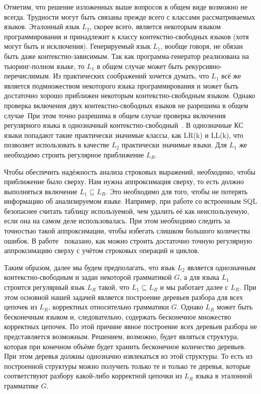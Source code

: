 Отметим, что решение изложенных выше вопросов в общем виде возможно не всегда. Трудности могут быть связаны прежде всего с классами рассматриваемых языков. Эталонный язык $L_2$, скорее всего, является некоторым языком программирования и принадлежит к классу контекстно-свободных языков (хотя могут быть и исключения). Генерируемый язык $L_1$, вообще говоря, не обязан быть даже контекстно-зависимым. Так как программа-генератор реализована на тьюринг-полном языке, то $L_1$ в общем случае может быть рекурсивно-перечислимым. Из практических соображений хочется думать, что $L_1$ всё же является подмножеством некоторого языка программирования и может быть достаточно хорошо приближен некоторым контекстно-свободным языком. Однако проверка включения двух контекстно-свободных языков не разрешима в общем случае~\cite{LangIncusion}При этом точно разрешима в общем случае проверка включения регулярного языка в однозначный контекстно-свободный~\cite{LangIncusion}. В однозначные КС языки попадают такие практически значимые классы, как LR(k) и LL(k), что позволяет использовать в качестве $L_2$ практически значимые языки. Для $L_1$ же необходимо строить регулярное приближение $L_R$.

Чтобы обеспечить надёжность анализа строковых выражений, необходимо, чтобы приближение было сверху. Нам нужна аппроксимация сверху, то есть должно выполняться включение $L_1 \subseteq L_R$. Это необходимо для того, чтобы не потерять информацию об анализируемом языке. Например, при работе со встроенным SQL безопаснее считать таблицу используемой, чем удалить её как неиспользуемую, если она на самом деле использовалась. При этом необходимо следить за точностью такой аппроксимации, чтобы избегать слишком большого количества ошибок. В работе~\cite{RegOverApprox} показано, как можно строить достаточно точную регулярную аппроксимацию сверху с учётом строковых операций и циклов.

Таким образом, далее мы будем предполагать, что язык $L_2$ является однозначным контекстно-свободным и задан некоторой грамматикой $G$, а для языка $L_1$ строится регулярный язык $L_R$ такой, что $L_1 \subseteq L_R$ и мы работает далее с $L_R$. При этом основной нашей задачей является построение деревьев разбора для всех цепочек из $L_R$, корректных относительно грамматики $G$. Однако $L_R$ может быть бесконечным языком и, следовательно, содержать бесконечное множество корректных цепочек. По этой причине явное построение всех деревьев разбора не представляется возможным. Решением, возможно, будет являться структура, которая при конечном объёме будет хранить бесконечное количество деревьев. При этом деревья должны однозначно извлекаться из этой структуры. То есть из построенной структуры можно получить только те и только те деревья, которые соответствуют разбору какой-либо корректной цепочки из $L_R$ языка в эталонной грамматике $G$.

